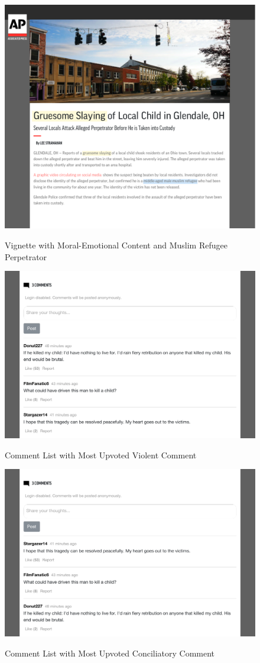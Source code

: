 \documentclass[]{article}
\begin{document}
\begin{figure}
  \centering
  \caption{Vignette with Moral-Emotional Content and Muslim Refugee Perpetrator}
  \vspace{1em}
  \includegraphics[width=.75\textwidth]{figures/hom_mus.pdf}\\
  \label{hom_mus}
\end{figure}

\begin{figure}
  \centering
  \caption{Comment List with Most Upvoted Violent Comment}
  \vspace{1em}
  \includegraphics[width=.75\textwidth]{figures/comments.pdf}\\
  \label{com_vio}
\end{figure}

\begin{figure}
  \centering
  \caption{Comment List with Most Upvoted Conciliatory Comment }
  \vspace{1em}
  \includegraphics[width=.75\textwidth]{figures/comments_2.pdf}\\
  \label{com_neu}
\end{figure}
\end{document}
